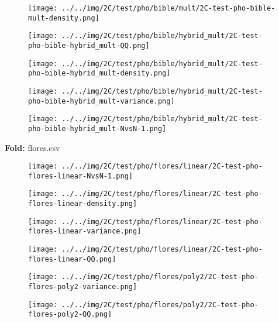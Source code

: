 \begin{figure}[H]
\centering	\texttt{[image: ../../img/2C/test/pho/bible/mult/2C-test-pho-bible-mult-density.png]}
\end{figure}
\begin{figure}[H]
\centering	\texttt{[image: ../../img/2C/test/pho/bible/hybrid\_mult/2C-test-pho-bible-hybrid\_mult-QQ.png]}
\end{figure}
\begin{figure}[H]
\centering	\texttt{[image: ../../img/2C/test/pho/bible/hybrid\_mult/2C-test-pho-bible-hybrid\_mult-density.png]}
\end{figure}
\begin{figure}[H]
\centering	\texttt{[image: ../../img/2C/test/pho/bible/hybrid\_mult/2C-test-pho-bible-hybrid\_mult-variance.png]}
\end{figure}
\begin{figure}[H]
\centering	\texttt{[image: ../../img/2C/test/pho/bible/hybrid\_mult/2C-test-pho-bible-hybrid\_mult-NvsN-1.png]}
\end{figure}
\textbf{Fold:} flores.csv
\begin{figure}[H]
\centering	\texttt{[image: ../../img/2C/test/pho/flores/linear/2C-test-pho-flores-linear-NvsN-1.png]}
\end{figure}
\begin{figure}[H]
\centering	\texttt{[image: ../../img/2C/test/pho/flores/linear/2C-test-pho-flores-linear-density.png]}
\end{figure}
\begin{figure}[H]
\centering	\texttt{[image: ../../img/2C/test/pho/flores/linear/2C-test-pho-flores-linear-variance.png]}
\end{figure}
\begin{figure}[H]
\centering	\texttt{[image: ../../img/2C/test/pho/flores/linear/2C-test-pho-flores-linear-QQ.png]}
\end{figure}
\begin{figure}[H]
\centering	\texttt{[image: ../../img/2C/test/pho/flores/poly2/2C-test-pho-flores-poly2-variance.png]}
\end{figure}
\begin{figure}[H]
\centering	\texttt{[image: ../../img/2C/test/pho/flores/poly2/2C-test-pho-flores-poly2-QQ.png]}
\end{figure}
